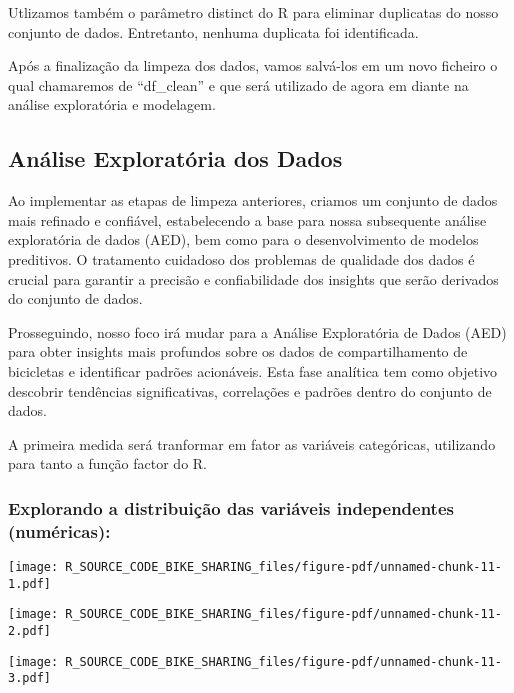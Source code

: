 \documentclass[
  letterpaper,
  DIV=11,
  numbers=noendperiod]{scrartcl}
\begin{document}
Utlizamos também o parâmetro distinct do R para eliminar duplicatas do
nosso conjunto de dados. Entretanto, nenhuma duplicata foi identificada.

Após a finalização da limpeza dos dados, vamos salvá-los em um novo
ficheiro o qual chamaremos de ``df\_clean'' e que será utilizado de
agora em diante na análise exploratória e modelagem.

\subsection{Análise Exploratória dos
Dados}\label{anuxe1lise-exploratuxf3ria-dos-dados}

Ao implementar as etapas de limpeza anteriores, criamos um conjunto de
dados mais refinado e confiável, estabelecendo a base para nossa
subsequente análise exploratória de dados (AED), bem como para o
desenvolvimento de modelos preditivos. O tratamento cuidadoso dos
problemas de qualidade dos dados é crucial para garantir a precisão e
confiabilidade dos insights que serão derivados do conjunto de dados.

Prosseguindo, nosso foco irá mudar para a Análise Exploratória de Dados
(AED) para obter insights mais profundos sobre os dados de
compartilhamento de bicicletas e identificar padrões acionáveis. Esta
fase analítica tem como objetivo descobrir tendências significativas,
correlações e padrões dentro do conjunto de dados.

A primeira medida será tranformar em fator as variáveis categóricas,
utilizando para tanto a função factor do R.

\subsubsection{Explorando a distribuição das variáveis independentes
(numéricas):}\label{explorando-a-distribuiuxe7uxe3o-das-variuxe1veis-independentes-numuxe9ricas}

\begin{center}
\texttt{[image: R\_SOURCE\_CODE\_BIKE\_SHARING\_files/figure-pdf/unnamed-chunk-11-1.pdf]}
\end{center}

\begin{center}
\texttt{[image: R\_SOURCE\_CODE\_BIKE\_SHARING\_files/figure-pdf/unnamed-chunk-11-2.pdf]}
\end{center}

\begin{center}
\texttt{[image: R\_SOURCE\_CODE\_BIKE\_SHARING\_files/figure-pdf/unnamed-chunk-11-3.pdf]}
\end{center}
\end{document}
